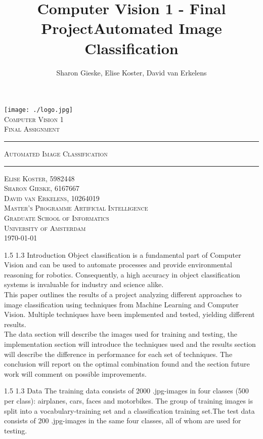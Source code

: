 \documentclass[12pt,a4paper]{amsart}
\title{Computer Vision 1 - Final Project}
\author{
Sharon Gieske, Elise Koster, David van Erkelens
}
\title{Automated Image Classification}
\date{}
\makeatletter
\def\section{%
  \@startsection{section}{1}{\z@}%
  {1.5\linespacing\@plus\linespacing}%
  {1.3\linespacing}%
  {\bfseries\normalfont\scshape}
}
\makeatother
\begin{document}
\begin{titlepage}
\begin{center}
    \texttt{[image: ./logo.jpg]}
    \\ [2.5cm]
    \textsc{\Large Computer Vision 1}
    \\ [0.5cm]
    \textsc{\large Final Assignment}
    \\ [1cm]
    \hrule
    \vspace{0.3cm}
    \textsc{Automated Image Classification}
    \\ [0.3cm]
    \hrule
    \vfill
    \textsc{Elise Koster, 5982448 \\ Sharon Gieske, 6167667 \\ David van Erkelens, 10264019 \\[0.7cm] Master's Programme Artificial Intelligence \\Graduate School of Informatics \\ University of Amsterdam \\[0.4cm] \today}
\end{center}
\end{titlepage}

\section{Introduction}
Object classification is a fundamental part of Computer Vision and can be used to automate processes and provide environmental reasoning for robotics. Consequently, a high accuracy in object classification systems is invaluable for industry and science alike.\\
This paper outlines the results of a project analyzing different approaches to image classification using techniques from Machine Learning and Computer Vision. Multiple techniques have been implemented and tested, yielding different results.\\
The data section will describe the images used for training and testing, the implementation section will introduce the techniques used and the results section will describe the difference in performance for each set of techniques. The conclusion will report on the optimal combination found and the section future work will comment on possible improvements.

\section{Data}
The training data consists of 2000 .jpg-images in four classes (500 per class): airplanes, cars, faces and motorbikes. The group of training images is split into a vocabulary-training set and a classification training set.The test data consists of 200 .jpg-images in the same four classes, all of whom are used for testing.
\end{document}
